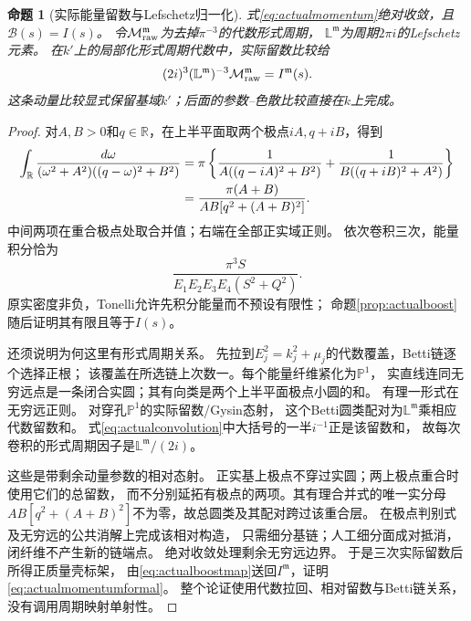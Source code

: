 \documentclass[11pt,a4paper]{ctexart}
\theoremstyle{cnplain}\newtheorem{theorem}{定理}[section]
\newtheorem{proposition}[theorem]{命题}
\theoremstyle{definition}\newtheorem{definition}[theorem]{定义}
\theoremstyle{remark}\newtheorem{remark}[theorem]{注}
\begin{document}
\begin{proposition}[实际能量留数与Lefschetz归一化]\label{prop:actualenergyresidue}
式\eqref{eq:actualmomentum}绝对收敛，且$\mathcal B(s)=I(s)$。
令$\mathcal M_{\rm raw}^{\mathfrak m}$为去掉$\pi^{-3}$的代数形式周期，
$\mathbb L^{\mathfrak m}$为周期$2\pi i$的Lefschetz元素。
在$k'$上的局部化形式周期代数中，实际留数比较给
\begin{equation}\label{eq:actualmomentumformal}
 (2i)^3(\mathbb L^{\mathfrak m})^{-3}
             \mathcal M_{\rm raw}^{\mathfrak m}=I^{\mathfrak m}(s).
\end{equation}
这条动量比较显式保留基域$k'$；后面的参数--色散比较直接在$k$上完成。
\end{proposition}
\begin{proof}
对$A,B>0$和$q\in\mathbb R$，在上半平面取两个极点$iA,q+iB$，得到
\begin{align}
 \int_{\mathbb R}\frac{d\omega}
 { (\omega^2+A^2)((q-\omega)^2+B^2)}
 &=\pi\left\{\frac1{A((q-iA)^2+B^2)}
             +\frac1{B((q+iB)^2+A^2)}\right\}\notag\\
 &=\frac{\pi(A+B)}{AB[q^2+(A+B)^2]}.
 \label{eq:actualconvolution}
\end{align}
中间两项在重合极点处取合并值；右端在全部正实域正则。
依次卷积三次，能量积分恰为
\[
 \frac{\pi^3S}{E_1E_2E_3E_4(S^2+Q^2)}.
\]
原实密度非负，Tonelli允许先积分能量而不预设有限性；
命题\ref{prop:actualboost}随后证明其有限且等于$I(s)$。

还须说明为何这里有形式周期关系。
先拉到$E_j^2=k_j^2+\mu_j$的代数覆盖，Betti链逐个选择正根；
该覆盖在所选链上次数一。每个能量纤维紧化为$\mathbb P^1$，
实直线连同无穷远点是一条闭合实圆；其有向类是两个上半平面极点小圆的和。
有理一形式在无穷远正则。
对穿孔$\mathbb P^1$的实际留数/Gysin态射，
这个Betti圆类配对为$\mathbb L^{\mathfrak m}$乘相应代数留数和。
式\eqref{eq:actualconvolution}中大括号的一半$i^{-1}$正是该留数和，
故每次卷积的形式周期因子是$\mathbb L^{\mathfrak m}/(2i)$。

这些是带剩余动量参数的相对态射。
正实基上极点不穿过实圆；两上极点重合时使用它们的总留数，
而不分别延拓有极点的两项。其有理合并式的唯一实分母
$AB[q^2+(A+B)^2]$不为零，故总圆类及其配对跨过该重合层。
在极点判别式及无穷远的公共消解上完成该相对构造，
只需细分基链；人工细分面成对抵消，闭纤维不产生新的链端点。
绝对收敛处理剩余无穷远边界。
于是三次实际留数后所得正质量壳标架，
由\eqref{eq:actualboostmap}送回$I^{\mathfrak m}$，证明\eqref{eq:actualmomentumformal}。
整个论证使用代数拉回、相对留数与Betti链关系，没有调用周期映射单射性。
\end{proof}
\end{document}
